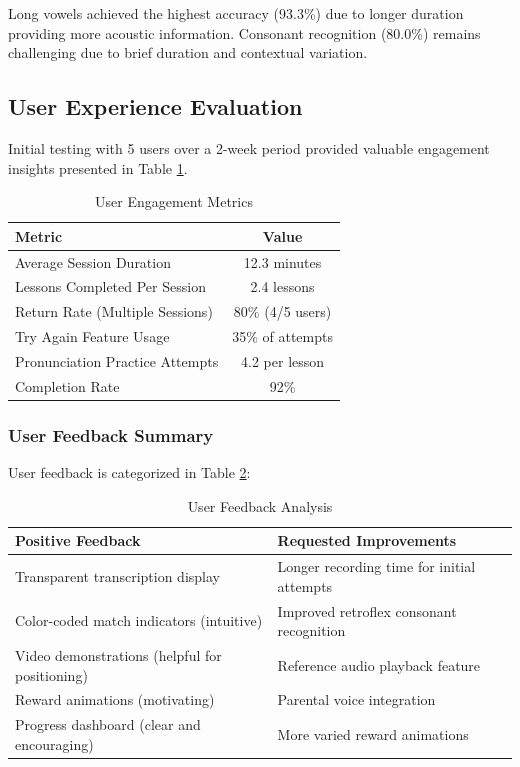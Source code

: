 \documentclass[12pt,a4paper]{article}
\begin{document}
Long vowels achieved the highest accuracy (93.3\%) due to longer duration providing more acoustic information. Consonant recognition (80.0\%) remains challenging due to brief duration and contextual variation.

\subsection{User Experience Evaluation}

Initial testing with 5 users over a 2-week period provided valuable engagement insights presented in Table \ref{tab:engagement}.

\begin{table}[H]
\centering
\caption{User Engagement Metrics}
\label{tab:engagement}
\begin{tabular}{lc}
\toprule
\textbf{Metric} & \textbf{Value} \\
\midrule
Average Session Duration & 12.3 minutes \\
Lessons Completed Per Session & 2.4 lessons \\
Return Rate (Multiple Sessions) & 80\% (4/5 users) \\
Try Again Feature Usage & 35\% of attempts \\
Pronunciation Practice Attempts & 4.2 per lesson \\
Completion Rate & 92\% \\
\bottomrule
\end{tabular}
\end{table}

\subsubsection{User Feedback Summary}

User feedback is categorized in Table \ref{tab:feedback}:

\begin{table}[H]
\centering
\caption{User Feedback Analysis}
\label{tab:feedback}
\small
\begin{tabular}{p{6.5cm}p{6.5cm}}
\toprule
\textbf{Positive Feedback} & \textbf{Requested Improvements} \\
\midrule
Transparent transcription display & Longer recording time for initial attempts \\
\hline
Color-coded match indicators (intuitive) & Improved retroflex consonant recognition \\
\hline
Video demonstrations (helpful for positioning) & Reference audio playback feature \\
\hline
Reward animations (motivating) & Parental voice integration \\
\hline
Progress dashboard (clear and encouraging) & More varied reward animations \\
\bottomrule
\end{tabular}
\end{table}
\end{document}
